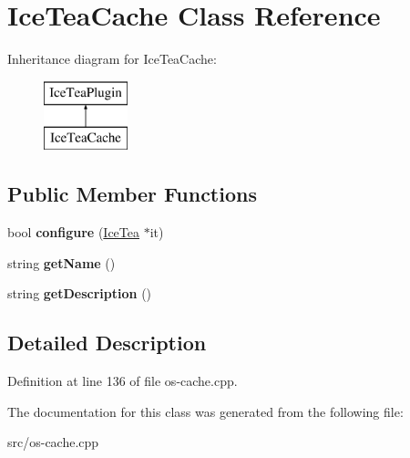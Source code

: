 \hypertarget{class_ice_tea_cache}{}\section{Ice\+Tea\+Cache Class Reference}
\label{class_ice_tea_cache}
Inheritance diagram for Ice\+Tea\+Cache\+:\begin{figure}[H]
\begin{center}
\leavevmode
\includegraphics[height=2.000000cm]{class_ice_tea_cache}
\end{center}
\end{figure}
\subsection*{Public Member Functions}
\begin{DoxyCompactItemize}
\item 
bool {\bfseries configure} (\hyperlink{class_ice_tea}{Ice\+Tea} $\ast$it)\hypertarget{class_ice_tea_cache_a7cda2adce734e5270ee5721c4ca10d89}{}\label{class_ice_tea_cache_a7cda2adce734e5270ee5721c4ca10d89}

\item 
string {\bfseries get\+Name} ()\hypertarget{class_ice_tea_cache_a18d92bc561ac8d16b3b87c1ce617a5d5}{}\label{class_ice_tea_cache_a18d92bc561ac8d16b3b87c1ce617a5d5}

\item 
string {\bfseries get\+Description} ()\hypertarget{class_ice_tea_cache_a41d3dcabbab20005662c68a52b820e6f}{}\label{class_ice_tea_cache_a41d3dcabbab20005662c68a52b820e6f}

\end{DoxyCompactItemize}


\subsection{Detailed Description}


Definition at line 136 of file os-\/cache.\+cpp.



The documentation for this class was generated from the following file\+:\begin{DoxyCompactItemize}
\item 
src/os-\/cache.\+cpp\end{DoxyCompactItemize}
